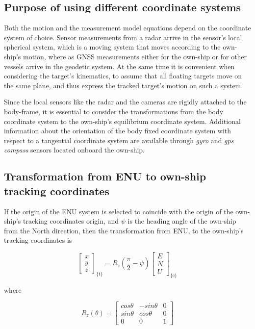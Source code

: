 \subsection{Purpose of using different coordinate systems}

Both the motion and the measurement model equations depend on the coordinate system of choice. Sensor measurements from a radar arrive in the sensor's local spherical system, which is a moving system that moves according to the own-ship's motion, where as GNSS measurements either for the own-ship or for other vessels arrive in the geodetic system. At the same time it is convenient when considering the target's kinematics, to assume that all floating targets move on the same plane, and thus express the tracked target's motion on such a system.

Since the local sensors like the radar and the cameras are rigidly attached to the body-frame, it is essential to consider the transformations from the body coordinate system to the own-ship's equilibrium coordinate system. Additional information about the orientation of the body fixed coordinate system with respect to a tangential coordinate system are available through \textit{gyro} and \textit{gps compass} sensors located onboard the own-ship. 

\subsection{Transformation from ENU to own-ship tracking coordinates}


If the origin of the ENU system is selected to coincide with the origin of the own-ship's tracking coordinates origin, and $\psi$ is the heading angle of the own-ship from the North direction, then the transformation from ENU, to the own-ship's tracking coordinates is




\begin{equation}
\begin{bmatrix}
x \\
y \\
z
\end{bmatrix}_{\text{\{t\}}} = R_{z}(\frac{\pi}{2}-\psi)
\begin{bmatrix}
E \\
N \\
U
\end{bmatrix}_{\text{\{e\}}}
\end{equation}

where

$$
R_{z}(\theta)=\begin{bmatrix}
cos\theta &-sin\theta &0\\
sin\theta &cos\theta &0 \\
0 &0 &1
\end{bmatrix}
$$

%
